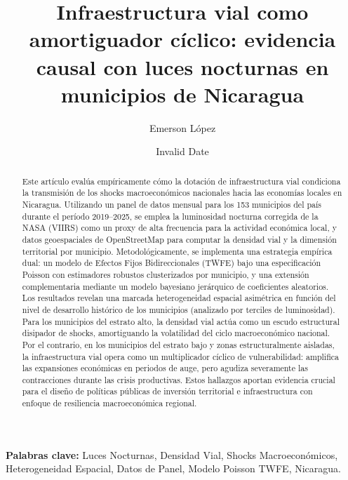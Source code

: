 \documentclass[
  spanish,
  12pt,
  12pt,
  a4paper]{article}
\title{Infraestructura vial como amortiguador cíclico: evidencia causal
con luces nocturnas en municipios de Nicaragua}
\author{Emerson López}
\date{Invalid Date}
\begin{document}
\maketitle


\begin{abstract}
Este artículo evalúa empíricamente cómo la dotación de infraestructura vial condiciona la transmisión de los shocks macroeconómicos nacionales hacia las economías locales en Nicaragua. Utilizando un panel de datos mensual para los 153 municipios del país durante el período 2019--2025, se emplea la luminosidad nocturna corregida de la NASA (VIIRS) como un proxy de alta frecuencia para la actividad económica local, y datos geoespaciales de OpenStreetMap para computar la densidad vial y la dimensión territorial por municipio. Metodológicamente, se implementa una estrategia empírica dual: un modelo de Efectos Fijos Bidireccionales (TWFE) bajo una especificación Poisson con estimadores robustos clusterizados por municipio, y una extensión complementaria mediante un modelo bayesiano jerárquico de coeficientes aleatorios. Los resultados revelan una marcada heterogeneidad espacial asimétrica en función del nivel de desarrollo histórico de los municipios (analizado por terciles de luminosidad). Para los municipios del estrato alto, la densidad vial actúa como un escudo estructural disipador de shocks, amortiguando la volatilidad del ciclo macroeconómico nacional. Por el contrario, en los municipios del estrato bajo y zonas estructuralmente aisladas, la infraestructura vial opera como un multiplicador cíclico de vulnerabilidad: amplifica las expansiones económicas en periodos de auge, pero agudiza severamente las contracciones durante las crisis productivas. Estos hallazgos aportan evidencia crucial para el diseño de políticas públicas de inversión territorial e infraestructura con enfoque de resiliencia macroeconómica regional.
\end{abstract}

\vspace{0.3cm}

\noindent\textbf{Palabras clave:} Luces Nocturnas, Densidad Vial, Shocks
Macroeconómicos, Heterogeneidad Espacial, Datos de Panel, Modelo Poisson
TWFE, Nicaragua.


\printbibliography
\end{document}
